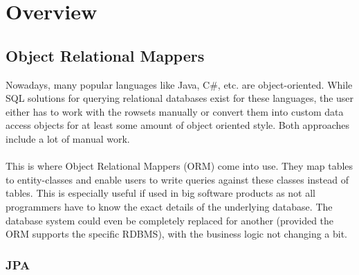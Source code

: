 \section{Overview}\label{Overview}

\subsection{Object Relational Mappers}
Nowadays, many popular languages like Java, C\#, etc. are object-oriented.
While SQL solutions for querying relational databases exist for these languages, the user either has to work with the rowsets manually or convert them into custom data access objects for at least some amount of object oriented style. Both approaches include a lot of manual work.
\\\\
This is where Object Relational Mappers (ORM) come into use. They map tables to entity-classes and
enable users to write queries against these classes instead of tables. This is especially useful if used
in big software products as not all programmers have to know the exact details of the underlying database. The database system could even be completely replaced for another (provided the ORM supports the specific RDBMS), with the business logic not changing a bit.

\subsubsection{JPA}

